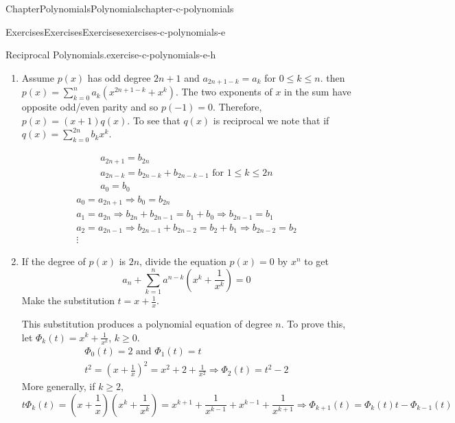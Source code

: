 \documentclass[oneside,10pt,]{book}
\numberwithin{equation}{section}
\begin{document}
\begin{chapterptx}{Chapter}{Polynomials}{}{Polynomials}{}{}{chapter-c-polynomials}
\begin{exercises-section}{Exercises}{Exercises}{}{Exercises}{}{}{exercises-c-polynomials-e}
\begin{divisionexercise}{7}{Reciprocal Polynomials.}{}{exercise-c-polynomials-e-h}
\begin{enumerate}[label=(\alph*)]
\item{}Assume \(p(x)\) has odd degree \(2n+1\) and \(a_{2n+1-k}=a_k\) for \(0 \leq k \leq n\). then \(p(x)=\sum_{k=0}^n a_k(x^{2n+1-k}+x^k)\). The two exponents of \(x\) in the sum have opposite odd\slash{}even parity and so \(p(-1) =0\). Therefore, \(p(x)=(x+1)q(x)\).  To see that \(q(x)\) is  reciprocal we note that if \(q(x)=\sum_{k=0}^{2n} b_k x^k\).%
\par
%
\begin{equation*}
\begin{split}
a_{2n+1} = b_{2n} \\
a_{2n-k} = b_{2n-k}+b_{2n-k-1}  \textrm{ for } 1 \leq k \leq 2n\\
a_0 = b_0 
\end{split}
\end{equation*}
%
\begin{equation*}
\begin{split}
a_0 = a_{2n+1} \Rightarrow b_0 = b_{2n}\\
a_1 =a_{2n} \Rightarrow b_{2n}+b_{2n-1} = b_1+b_0 \Rightarrow b_{2n-1}=b_1\\
a_2 =a_{2n-1} \Rightarrow b_{2n-1}+b_{2n-2} = b_2+b_1 \Rightarrow b_{2n-2}=b_2\\
\vdots
\end{split}
\end{equation*}
%
\item{}If the degree of \(p(x)\) is \(2n\), divide the equation \(p(x)=0\) by \(x^n\) to get%
\begin{equation*}
a_n + \sum_{k=1}^n  a^{n-k} (x^k+ \frac{1}{x^k}) =0
\end{equation*}
Make the substitution \(t=x+\frac{1}{x}\).%
\par
This substitution  produces a polynomial equation of degree \(n\).  To prove this, let \(\Phi_k(t) =x^k+ \frac{1}{x^k}\), \(k\geq 0\).%
\begin{equation*}
\begin{split}
\Phi_0(t) = 2  \textrm{ and }  \Phi_1(t)=t\\
t^2 =  (x+\frac{1}{x})^2 = x^2+2+\frac{1}{x^2} \Rightarrow \Phi_2(t)=t^2-2
\end{split}
\end{equation*}
More generally, if \(k \geq 2\),%
\begin{equation*}
t \Phi_k(t) = (x+\frac{1}{x})(x^k+\frac{1}{x^k})= x^{k+1}+ \frac{1}{x^{k-1}}+x^{k-1}+ \frac{1}{x^{k+1}}
\Rightarrow \Phi_{k+1}(t)= \Phi_k(t) t -\Phi_{k-1}(t)

\end{equation*}
\end{enumerate}
\end{divisionexercise}
\end{exercises-section}
\end{chapterptx}
\end{document}
